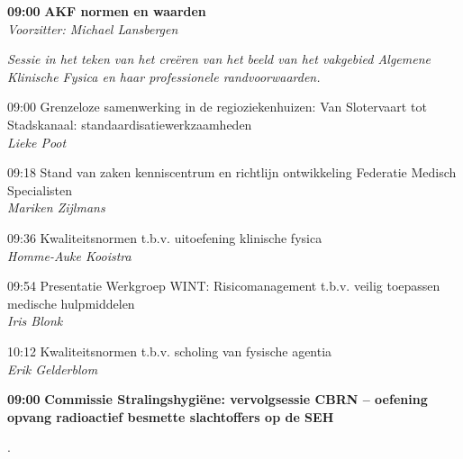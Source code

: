 \documentclass[a4paper,10pt]{report}
\begin{document}
\begin{multicols*}{3}
\vfill
{}
\begin{packed_enum}
\item[\textbf{09:00}] \textbf{AKF normen en waarden}\\\textit{Voorzitter: Michael Lansbergen}
\end{packed_enum}
\textit{Sessie in het teken van het cre\"eren van het beeld van het vakgebied Algemene Klinische Fysica en haar professionele randvoorwaarden.}
\begin{packed_enum}
\item[09:00] Grenzeloze samenwerking in de regioziekenhuizen: Van Slotervaart tot Stadskanaal: standaardisatiewerkzaamheden\\\textit{Lieke Poot}
\item[09:18] Stand van zaken kenniscentrum en richtlijn ontwikkeling Federatie Medisch Specialisten\\\textit{Mariken Zijlmans}
\item[09:36] Kwaliteitsnormen t\@.b\@.v\@. uitoefening klinische fysica\\\textit{Homme-Auke Kooistra} 
\item[09:54] Presentatie Werkgroep WINT: Risicomanagement t\@.b\@.v\@. veilig toepassen medische hulpmiddelen\\\textit{Iris Blonk}
\item[10:12] Kwaliteitsnormen t\@.b\@.v\@. scholing van fysische agentia\\\textit{Erik Gelderblom}
\end{packed_enum}

\vfill
{}
\begin{packed_enum}
\item[\textbf{09:00}] \textbf{Commissie Stralingshygiëne: vervolgsessie CBRN -- oefening opvang radioactief besmette slachtoffers op de SEH}
\end{packed_enum}
.


\end{multicols*}
\end{document}
